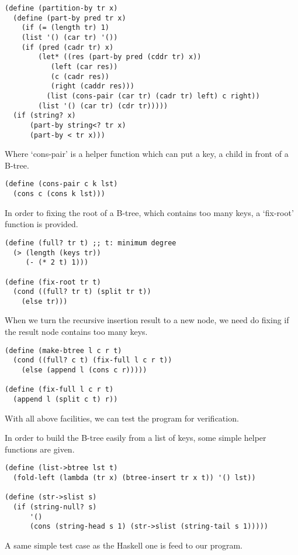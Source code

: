 \documentclass{article}
\begin{document}
\begin{lstlisting}
(define (partition-by tr x)
  (define (part-by pred tr x)
    (if (= (length tr) 1)
	(list '() (car tr) '())
	(if (pred (cadr tr) x)
	    (let* ((res (part-by pred (cddr tr) x))
		   (left (car res))
		   (c (cadr res))
		   (right (caddr res)))
	      (list (cons-pair (car tr) (cadr tr) left) c right))
	    (list '() (car tr) (cdr tr)))))
  (if (string? x)
      (part-by string<? tr x)
      (part-by < tr x)))
\end{lstlisting}

Where `cons-pair' is a helper function which can put a key, a
child in front of a B-tree.

\begin{lstlisting}
(define (cons-pair c k lst)
  (cons c (cons k lst)))
\end{lstlisting}

In order to fixing the root of a B-tree, which contains too many
keys, a `fix-root' function is provided.

\begin{lstlisting}
(define (full? tr t) ;; t: minimum degree
  (> (length (keys tr)) 
     (- (* 2 t) 1)))

(define (fix-root tr t)
  (cond ((full? tr t) (split tr t))
	(else tr)))
\end{lstlisting}

When we turn the recursive insertion result to a new node, we
need do fixing if the result node contains too many keys.

\begin{lstlisting}
(define (make-btree l c r t)
  (cond ((full? c t) (fix-full l c r t))
	(else (append l (cons c r)))))

(define (fix-full l c r t)
  (append l (split c t) r))
\end{lstlisting}

With all above facilities, we can test the program for verification.

In order to build the B-tree easily from a list of keys, some simple
helper functions are given.

\begin{lstlisting}
(define (list->btree lst t)
  (fold-left (lambda (tr x) (btree-insert tr x t)) '() lst))

(define (str->slist s)
  (if (string-null? s)
      '()
      (cons (string-head s 1) (str->slist (string-tail s 1)))))
\end{lstlisting}

A same simple test case as the Haskell one is feed to our program.
\end{document}
